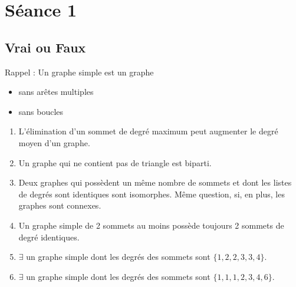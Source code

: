 \section{Séance 1}

\subsection{Vrai ou Faux}
Rappel : Un graphe simple est un graphe
\begin{itemize}
  \item sans arêtes multiples
  \item sans boucles
\end{itemize}
\begin{enumerate}
  \item L'élimination d'un sommet de degré maximum peut augmenter le degré moyen d'un graphe.
  \item Un graphe qui ne contient pas de triangle est biparti.
  \item Deux graphes qui possèdent un même nombre de sommets et dont les listes de degrés sont identiques sont isomorphes. Même question, si, en plus, les graphes sont connexes.
  \item Un graphe simple de 2 sommets au moins possède toujours 2 sommets de degré identiques.
  \item $\exists$ un graphe simple dont les degrés des sommets sont $\{1,2,2,3,3,4\}$.
  \item $\exists$ un graphe simple dont les degrés des sommets sont $\{1,1,1,2,3,4,6\}$.
\end{enumerate}

